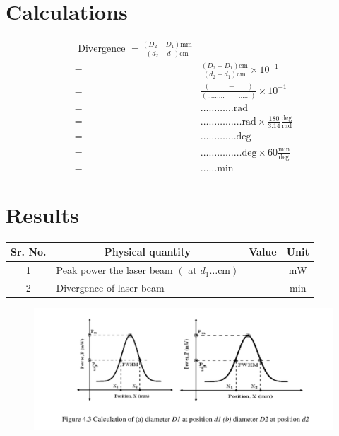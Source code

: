 \documentclass[11pt]{article}
\begin{document}
	\section{Calculations}

	$$
	\begin{aligned}
	\text { Divergence }=\frac{\left(D_{2}-D_{1}\right) \mathrm{mm}}{\left(d_{2}-d_{1}\right) \mathrm{cm}} \\
	=& \frac{\left(D_{2}-D_{1}\right) \mathrm{cm}}{\left(d_{2}-d_{1}\right) \mathrm{cm}} \times 10^{-1} \\
	=& \frac{(\ldots \ldots \ldots-\ldots \ldots)}{(\ldots \ldots \ldots-\cdots \ldots \ldots)} \times 10^{-1} \\
	=& \dots \ldots \ldots \ldots \mathrm{rad} \\
	=& \dots \ldots \ldots \ldots \ldots \mathrm{rad} \times \frac{180}{3.14} \frac{\mathrm{deg}}{\mathrm{rad}} \\
	=& \dots \ldots \ldots \ldots . \mathrm{deg} \\
	=& \dots \ldots \ldots \ldots \ldots \mathrm{deg} \times 60 \frac{\mathrm{min}}{\mathrm{deg}} \\
	=& \dots \ldots \mathrm{min}
	\end{aligned}
	$$

	\section{Results}
	\begin{centering}
	\begin{tabular}{|c|l|c|c|}
	\hline Sr. No. & \multicolumn{1}{|c|}{ Physical quantity } & Value & Unit \\
	\hline 1 & Peak power the laser beam $\left(\right.$ at $\left.d_{1} \ldots \mathrm{cm}\right)$ & & $\mathrm{mW}$ \\
	\hline 2 & Divergence of laser beam & & $\mathrm{min}$ \\
	\hline
	\end{tabular}
	\end{centering}
	\begin{figure}[H]
		\centering
		\includegraphics[scale=0.4]{2.png}
		\label{it}
	\end{figure}
	
\end{document}

